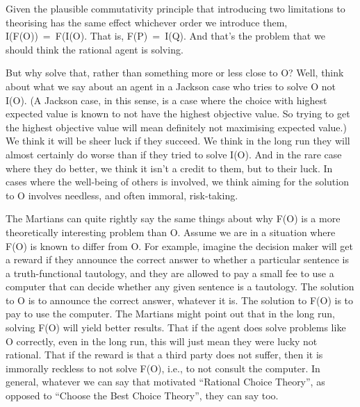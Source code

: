 \documentclass[
  10pt,
  letterpaper,
  twoside]{scrbook}
\begin{document}
Given the plausible commutativity principle that introducing two
limitations to theorising has the same effect whichever order we
introduce them, I(F(O))~=~F(I(O). That is, F(P)~=~I(Q). And that's the
problem that we should think the rational agent is solving.

But why solve that, rather than something more or less close to O? Well,
think about what we say about an agent in a Jackson case who tries to
solve O not I(O). (A Jackson case, in this sense, is a case where the
choice with highest expected value is known to not have the highest
objective value. So trying to get the highest objective value will mean
definitely not maximising expected value.) We think it will be sheer
luck if they succeed. We think in the long run they will almost
certainly do worse than if they tried to solve I(O). And in the rare
case where they do better, we think it isn't a credit to them, but to
their luck. In cases where the well-being of others is involved, we
think aiming for the solution to O involves needless, and often immoral,
risk-taking.

The Martians can quite rightly say the same things about why F(O) is a
more theoretically interesting problem than O. Assume we are in a
situation where F(O) is known to differ from O. For example, imagine the
decision maker will get a reward if they announce the correct answer to
whether a particular sentence is a truth-functional tautology, and they
are allowed to pay a small fee to use a computer that can decide whether
any given sentence is a tautology. The solution to O is to announce the
correct answer, whatever it is. The solution to F(O) is to pay to use
the computer. The Martians might point out that in the long run, solving
F(O) will yield better results. That if the agent does solve problems
like O correctly, even in the long run, this will just mean they were
lucky not rational. That if the reward is that a third party does not
suffer, then it is immorally reckless to not solve F(O), i.e., to not
consult the computer. In general, whatever we can say that motivated
``Rational Choice Theory'', as opposed to ``Choose the Best Choice
Theory'', they can say too.
\end{document}
